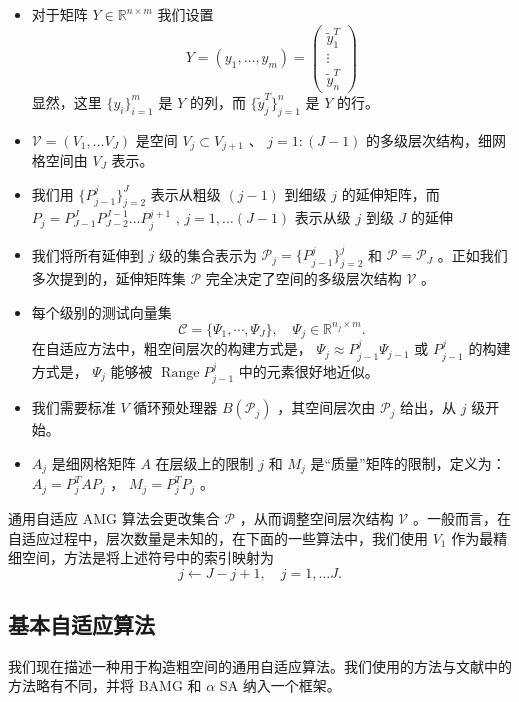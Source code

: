 \documentclass[12pt]{acta_2011xz}
\DeclareMathOperator*{\range}{Range}
\begin{document}
   \begin{itemize}

    \item   对于矩阵    $Y\in \mathbb{R}^{n\times m}$    我们设置
   \[
Y= (y_1, \ldots, y_m)=
\begin{pmatrix}
\widetilde y_1^T \\ 
\vdots \\ 
\widetilde y_n^T
\end{pmatrix}
\]    显然，这里    $ \{ y_i \} _{i=1}^m$    是    $Y$    的列，而    $ \{ \widetilde y_j^T \} _{j=1}^n$    是    $Y$    的行。   \item      $\mathcal{V}=(V_1,\ldots V_J)$    是空间    $V_{j}\subset V_{j+1}$   、   $j=1:(J-1)$    的多级层次结构，细网格空间由    $V_J$    表示。   \item   我们用    $ \{ P_{j-1}^{j} \} _{j=2}^{J}$    表示从粗级    $(j-1)$    到细级    $j$    的延伸矩阵，而
   $P_j=P_{J-1}^{J}P_{J-2}^{J-1}\ldots P_{j}^{j+1}$    ,    $j=1,\ldots (J-1)$    表示从级    $j$    到级    $J$    的延伸   \item   我们将所有延伸到    $j$    级的集合表示为
   $\mathcal{P}_j= \{ P_{j-1}^j \} _{j=2}^{j}$    和 
   $\mathcal{P}=\mathcal{P}_J$    。正如我们多次提到的，延伸矩阵集    $\mathcal{P}$    完全决定了空间的多级层次结构    $\mathcal{V}$    。   \item   每个级别的测试向量集
   \[  
\mathcal C= \{ \Psi_1, \cdots, \Psi_J \} , \quad \Psi_j\in \mathbb{R}^{n_j\times m}.
\]    在自适应方法中，粗空间层次的构建方式是，   $\Psi_j \approx P_{j-1}^j\Psi_{j-1}$    或 
   $P_{j-1}^j$    的构建方式是，   $\Psi_j$    能够被 
   $\range{P_{j-1}^j}$    中的元素很好地近似。   \item   我们需要标准    $V$    循环预处理器    $B(\mathcal{P}_j)$   ，其空间层次由    $\mathcal{P}_j$    给出，从    $j$    级开始。   \item      $A_j$    是细网格矩阵    $A$    在层级上的限制
   $j$    和    $M_j$    是“质量”矩阵的限制，定义为：
   \(A_j =P_j^T A P_j\)    ，    \(M_j = P_j^TP_j\)    。  \end{itemize}     

通用自适应 AMG 算法会更改集合    $\mathcal{P}$    ，从而调整空间层次结构    $\mathcal{V}$    。一般而言，在自适应过程中，层次数量是未知的，在下面的一些算法中，我们使用    $V_1$    作为最精细空间，方法是将上述符号中的索引映射为
   \[
j\leftarrow J-j+1, \quad j=1,\ldots J. 
\]     

   \subsection{基本自适应算法  }    我们现在描述一种用于构造粗空间的通用自适应算法。我们使用的方法与文献中的方法略有不同，并将 BAMG 和    $\alpha$    SA 纳入一个框架。  
\end{document}
